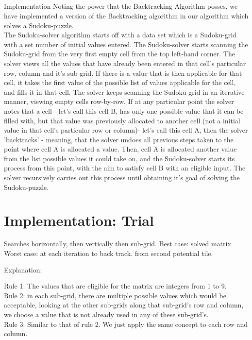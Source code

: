 \documentclass[12pt]{article}
\begin{document}
\subsection{}{Implementation}
Noting the power that the Backtracking Algorithm posses, we have implemented a version of the Backtracking algorithm in our algorithm which solves a Sudoku-puzzle.\\
The Sudoku-solver algorithm starts off with a data set which is a Sudoku-grid with a set number of initial values entered.%
The Sudoku-solver starts scanning the Sudoku-grid from the very first empty cell from the top left-hand corner. The solver views all the values that have already been entered in that cell's particular row, column and it's sub-grid. If there is a value that is then applicable for that cell, it takes the first value of the possible list of values applicable for the cell, and fills it in that cell. The solver keeps scanning the Sudoku-grid in an iterative manner, viewing empty cells row-by-row. If at any particular point the solver notes that a cell - let's call this cell B,  has only one possible value that it can be filled with, but that value was previously allocated to another cell %
(not a initial value in that cell's particular row or column)- let's call this cell A, then the solver 'backtracks' - meaning, that the solver undoes all previous steps taken to the point where cell A is allocated a value. Then, cell A is allocated another value from the list possible values it could take on, and the Sudoku-solver starts its process from this point, with the aim to satisfy cell B with an eligible input. The solver recursively carries out this process until obtaining it's goal of solving the Sudoku-puzzle.  


\section{Implementation: Trial}
\begin{flushleft}
Searches horizontally, then vertically then sub-grid. 
Best case: solved matrix
Worst case: at each iteration to back track. from second potential tile. 

\end{flushleft}

\begin{flushleft}
Explanation:
\end{flushleft}  
Rule 1: The values that are  eligible for the matrix are integers from 1 to 9.\\
Rule 2: in each sub-grid, there are multiple possible values which would be acceptable, looking at the other sub-grids along that sub-grid's row and column, we choose a value that is not already used in any of these sub-grid's. \\
Rule 3: Similar to that of rule 2. We just apply the same concept to each row and column. 
\end{document}
